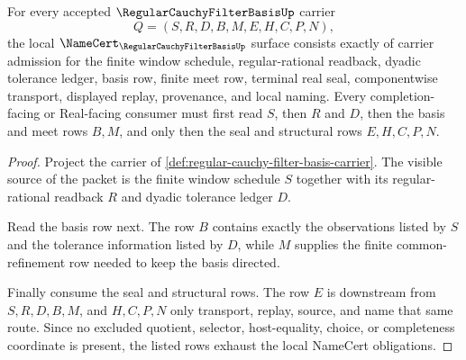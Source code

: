 \begin{theorem}
\label{thm:regular-cauchy-filter-basis-namecert-obligations}
For every accepted $\RegularCauchyFilterBasisUp$ carrier
$$
Q=(S,R,D,B,M,E,H,C,P,N),
$$
the local $\NameCert_{\RegularCauchyFilterBasisUp}$ surface consists exactly of carrier admission for the finite window schedule, regular-rational readback, dyadic tolerance ledger, basis row, finite meet row, terminal real seal, componentwise transport, displayed replay, provenance, and local naming. Every completion-facing or Real-facing consumer must first read $S$, then $R$ and $D$, then the basis and meet rows $B,M$, and only then the seal and structural rows $E,H,C,P,N$.
\end{theorem}
\begin{proof}
Project the carrier of \autoref{def:regular-cauchy-filter-basis-carrier}. The visible source of the packet is the finite window schedule $S$ together with its regular-rational readback $R$ and dyadic tolerance ledger $D$.

Read the basis row next. The row $B$ contains exactly the observations listed by $S$ and the tolerance information listed by $D$, while $M$ supplies the finite common-refinement row needed to keep the basis directed.

Finally consume the seal and structural rows. The row $E$ is downstream from $S,R,D,B,M$, and $H,C,P,N$ only transport, replay, source, and name that same route. Since no excluded quotient, selector, host-equality, choice, or completeness coordinate is present, the listed rows exhaust the local NameCert obligations.
\end{proof}


